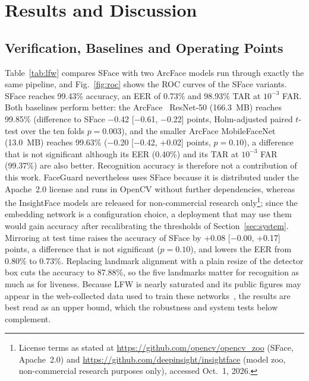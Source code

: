 \documentclass{ieeeaccess}
\begin{document}
\section{Results and Discussion}\label{sec:results}

\subsection{Verification, Baselines and Operating Points}
Table~\ref{tab:lfw} compares SFace with two ArcFace models run through exactly the same pipeline, and Fig.~\ref{fig:roc} shows the ROC curves of the SFace variants. SFace reaches 99.43\% accuracy, an EER of 0.73\% and 98.93\% TAR at $10^{-3}$ FAR. Both baselines perform better: the ArcFace~\cite{deng2019arcface} ResNet-50 (166.3~MB) reaches 99.85\% (difference to SFace $-$0.42 [$-$0.61, $-$0.22] points, Holm-adjusted paired $t$-test over the ten folds $p=0.003$), and the smaller ArcFace MobileFaceNet (13.0~MB) reaches 99.63\% ($-$0.20 [$-$0.42, +0.02] points, $p=0.10$), a difference that is not significant although its EER (0.40\%) and its TAR at $10^{-3}$ FAR (99.37\%) are also better. Recognition accuracy is therefore not a contribution of this work. FaceGuard nevertheless uses SFace because it is distributed under the Apache~2.0 license and runs in OpenCV without further dependencies, whereas the InsightFace models are released for non-commercial research only\footnote{License terms as stated at \url{https://github.com/opencv/opencv_zoo} (SFace, Apache~2.0) and \url{https://github.com/deepinsight/insightface} (model zoo, non-commercial research purposes only), accessed Oct.~1, 2026.}; since the embedding network is a configuration choice, a deployment that may use them would gain accuracy after recalibrating the thresholds of Section~\ref{sec:system}. Mirroring at test time raises the accuracy of SFace by +0.08 [$-$0.00, +0.17] points, a difference that is not significant ($p=0.10$), and lowers the EER from 0.80\% to 0.73\%. Replacing landmark alignment with a plain resize of the detector box cuts the accuracy to 87.88\%, so the five landmarks matter for recognition as much as for liveness. Because LFW is nearly saturated and its public figures may appear in the web-collected data used to train these networks~\cite{zhu2021webface260m}, the results are best read as an upper bound, which the robustness and system tests below complement.
\end{document}

